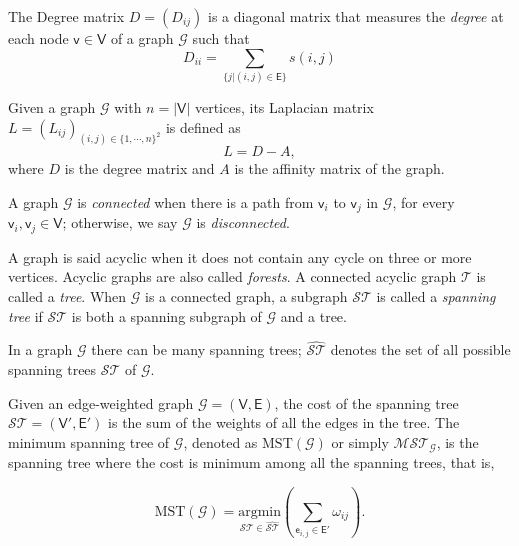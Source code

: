 \begin{definition}
	The Degree matrix $D=(D_{ij})$ is a diagonal matrix that measures the \textit{degree} at each node $\mathsf{v} \in \mathsf{V}$ of a graph $\mathcal{G}$ such that 
	\begin{equation}	
		D_{ii} =  \underset{\{j|(i,j)\in \mathsf{E}\}}{\sum}  s(i,j)  \nonumber 		
	\end{equation}	
\end{definition}

\begin{definition}
	Given a graph $\mathcal{G}$ with $n=|\mathsf{V}|$ vertices, its Laplacian matrix $L = (L_{ij})_{(i, j)\in \{1,\cdots, n\}^2}$ is defined as 
	\begin{equation}	
		L = D - A,  \nonumber 		
	\end{equation}	
where $D$ is the degree matrix and $A$ is the affinity matrix of the graph.
\end{definition}

\begin{definition}
	A graph $\mathcal{G}$ is \textit{connected} when there is a path from $\mathsf{v}_{i}$ to $\mathsf{v}_{j}$ in $\mathcal{G}$, for every $\mathsf{v}_{i},\mathsf{v}_{j} \in \mathsf{V}$; otherwise, we say $\mathcal{G}$ is \textit{disconnected}.	
\end{definition}

\begin{definition}
	A graph is said acyclic when it does not contain any cycle on three or more vertices. Acyclic graphs are also called \textit{forests}. A connected acyclic graph $\mathcal{T}$ is called a \textit{tree}. When $\mathcal{G}$ is a connected graph, a subgraph $\mathcal{ST}$ is called a \textit{spanning tree} if $\mathcal{ST}$ is both a spanning subgraph of $\mathcal{G}$ and a tree. 
	
	In a graph $\mathcal{G}$ there can be many spanning trees; $\widehat{\mathcal{ST}}$ denotes the set of all possible spanning trees $\mathcal{ST}$ of $\mathcal{G}$.
\end{definition}

\begin{definition}
	Given an edge-weighted graph $\mathcal{G}=(\mathsf{V}, \mathsf{E})$, the cost of the spanning tree $\mathcal{ST}=(\mathsf{V}', \mathsf{E}')$ is the sum of the weights of all the edges in the tree. The minimum spanning tree of $\mathcal{G}$, denoted as $\mathrm{MST}(\mathcal{G})$ or simply $\mathcal{MST}_{\mathcal{G}}$, is the spanning tree where the cost is minimum among all the spanning trees, that is,
	
\begin{equation}
	\mathrm{MST}(\mathcal{G}) = \underset{\mathcal{ST} \in \widehat{\mathcal{ST}}}{\mathrm{argmin}} \left( \sum_{\mathsf{e}_{i,j} \in \mathsf{E}'} \omega_{ij} \right). \nonumber
\end{equation}

\end{definition}

